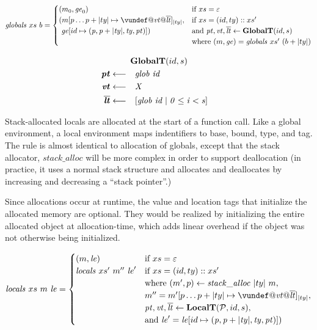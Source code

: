 \documentclass[acmsmall,review,anonymous]{acmart}\settopmatter{printfolios=true,printccs=false,printacmref=false}
\begin{document}

\[\mathit{globals} ~ xs ~ b =
\begin{cases}
  (\mem_0, \genv_0) & \textnormal{if } xs = \varepsilon \\
  (\mem[p \dots p+|ty| \mapsto \vundef@\vt@\overline{\lt}]_{|ty|}, & \textnormal{if } xs = (id,ty)::xs' \\
  ~ \genv[id \mapsto (\mathit{p, p+|ty|,ty,\pt})]) & \textnormal{and } \trule{\globaltres}{\globalt} \\
  & \textnormal{where } (\mem,\genv) = \mathit{globals} ~ xs' ~ (b + |ty|) \\
\end{cases}\]

\[\begin{aligned}
\truledef{\globalt}
\settag{\pt}{\mathit{glob ~ id}}
\settag{\vt}{X}
\settag{\overline{\lt}}{\left[\mathit{glob} ~ id \mid 0 \leq i < s\right]}
\end{aligned}\]

Stack-allocated locals are allocated at the start of a function call. Like a global environment,
a local environment maps indentifiers to base, bound, type, and tag. The rule is almost identical
to allocation of globals, except that the stack allocator, \(\mathit{stack\_alloc}\) will be more
complex in order to support deallocation (in practice, it uses a normal stack structure and allocates
and deallocates by increasing and decreasing a ``stack pointer''.)

Since allocations occur at runtime, the value and location tags that initialize the allocated memory
are optional. They would be realized by initializing the entire allocated object at allocation-time,
which adds linear overhead if the object was not otherwise being initialized.

\[\mathit{locals} ~ xs ~ \mem ~ \lenv =
\begin{cases}
  (\mem, \lenv) & \textnormal{if } xs = \varepsilon \\
  \mathit{locals} ~ xs' ~ \mem'' ~ \lenv' & \textnormal{if } xs = (id,ty)::xs' \\
  & \textnormal{where } (\mem',p) \leftarrow \mathit{stack\_alloc} ~ |ty| ~ \mem, \\
  & \mem'' = \mem'[p \dots p+|ty| \mapsto \vundef@\vt@\overline{\lt}]_{|ty|}, \\
  & \trule{\localtres}{\localt}, \\
  & \textnormal{and } \lenv' = \lenv[id \mapsto (\mathit{p, p+|ty|,ty,\pt})]) \\
\end{cases}\]
              
\end{document}
